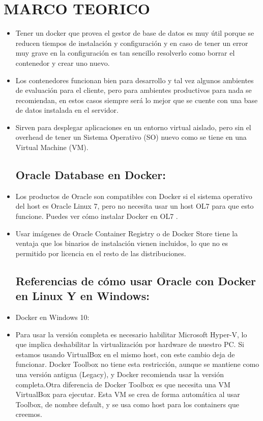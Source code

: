 \section{MARCO TEORICO} 

\begin{itemize}
\subsection{ Docker:}
	\item Tener un docker que provea el gestor de base de datos es muy útil porque se reducen tiempos de instalación y configuración y en caso de tener un error muy grave en la configuración es tan sencillo resolverlo como borrar el contenedor y crear uno nuevo.
          \item Los contenedores funcionan bien para desarrollo y tal vez algunos ambientes de evaluación para el cliente, pero para ambientes productivos para nada se recomiendan, en estos casos siempre será lo mejor que se cuente con una base de datos instalada en el servidor.
         \item Sirven para desplegar aplicaciones en un entorno virtual aislado, pero sin el overhead de tener un Sistema Operativo (SO) nuevo como se tiene en una Virtual Machine (VM).

\subsection{Oracle Database en Docker:}
	\item Los productos de Oracle son compatibles con Docker si el sistema operativo del host es Oracle Linux 7, pero no necesita usar un host OL7 para que esto funcione. Puedes ver cómo instalar Docker en OL7 .
	\item Usar imágenes de Oracle Container Registry o de Docker Store tiene la ventaja que los binarios de instalación vienen incluidos, lo que no es permitido por licencia en el resto de las distribuciones. 
\subsection{Referencias de cómo usar Oracle con Docker en Linux Y  en Windows:}
	\item Docker en Windows 10:
	\item Para usar la versión completa es necesario habilitar Microsoft Hyper-V, lo que implica deshabilitar la virtualización por hardware de nuestro PC. Si estamos usando VirtualBox en el mismo host, con este cambio deja de funcionar.
Docker Toolbox no tiene esta restricción, aunque se mantiene como una versión antigua (Legacy), y Docker recomienda usar la versión completa.Otra diferencia de Docker Toolbox es que necesita una VM VirtualBox para ejecutar. Esta VM se crea de forma automática al usar Toolbox, de nombre default, y se usa como host para los containers que creemos.

\end{itemize}
